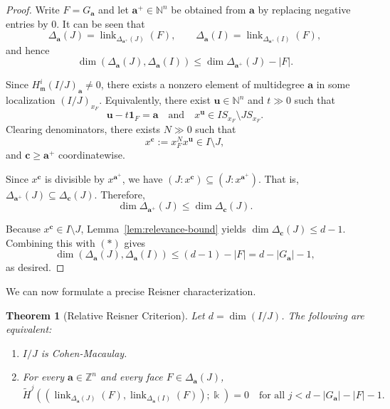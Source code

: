 \documentclass[12pt]{amsart}
\numberwithin{equation}{section}
\newtheorem{theorem}{Theorem}[section]
\theoremstyle{definition}
\theoremstyle{definition}
\DeclareMathOperator{\link}{link}
\newcommand{\ZZ}{{\mathbb Z}}
\newcommand{\NN}{{\mathbb N}}
\def\kk{{\Bbbk}}
\def\mm{{\mathfrak m}}
\begin{document}
\begin{proof}
	Write $F=G_{\mathbf a}$ and let $\mathbf a^+\in\NN^n$ be obtained from
	$\mathbf a$ by replacing negative entries by $0$.
	It can be seen that
	\[
	\Delta_{\mathbf a}(J)=\link_{\Delta_{\mathbf a^+}(J)}(F),
	\qquad
	\Delta_{\mathbf a}(I)=\link_{\Delta_{\mathbf a^+}(I)}(F),
	\]
	and hence
	\[
	\dim\!\left(\Delta_{\mathbf a}(J),\Delta_{\mathbf a}(I)\right)
	\le \dim\Delta_{\mathbf a^+}(J)-|F|.
	\tag{$\ast$}
	\]
	
	Since $H^i_{\mm}(I/J)_{\mathbf a}\neq 0$, there exists a nonzero element
	of multidegree $\mathbf a$ in some localization $(I/J)_{x_F}$.
	Equivalently, there exist $\mathbf u\in\NN^n$ and $t\gg 0$ such that
	\[
	\mathbf u-t\mathbf 1_F=\mathbf a
	\quad\text{and}\quad
	x^{\mathbf u}\in I S_{x_F}\setminus J S_{x_F}.
	\]
	Clearing denominators, there exists $N\gg0$ such that
	\[
	x^{\mathbf c}:=x_F^N x^{\mathbf u}\in I\setminus J,
	\]
	and $\mathbf c\ge \mathbf a^+$ coordinatewise.
	
	Since $x^{\mathbf c}$ is divisible by $x^{\mathbf a^+}$, we have $(J:x^{\mathbf c})\subseteq (J:x^{\mathbf a^+}).$
	That is, $\Delta_{\mathbf a^+}(J)\subseteq \Delta_{\mathbf c}(J).$
	Therefore,
	\[
	\dim\Delta_{\mathbf a^+}(J)\le \dim\Delta_{\mathbf c}(J).
	\]
	
	Because $x^{\mathbf c}\in I\setminus J$, Lemma~\ref{lem:relevance-bound} yields $\dim\Delta_{\mathbf c}(J)\le d-1.$
	Combining this with $(\ast)$ gives
	\[
	\dim\!\left(\Delta_{\mathbf a}(J),\Delta_{\mathbf a}(I)\right)
	\le (d-1)-|F|=d-|G_{\mathbf a}|-1,
	\]
	as desired.
\end{proof}

We can now formulate a precise Reisner characterization.

\begin{theorem}[Relative Reisner Criterion]\label{thm:relative-reisner}
	Let $d=\dim(I/J)$. The following are equivalent:
	\begin{enumerate}
		\item $I/J$ is Cohen-Macaulay.
		\item For every $\mathbf a\in\ZZ^n$ and every face
		$F\in\Delta_{\mathbf a}(J)$,
		\[
		\widetilde H^j\!\left((
		\link_{\Delta_{\mathbf a}(J)}(F),
		\link_{\Delta_{\mathbf a}(I)}(F));\kk
		\right)=0
		\quad\text{for all } j< d-|G_{\mathbf a}|-|F|-1.
		\]
	\end{enumerate}
\end{theorem}
\end{document}
